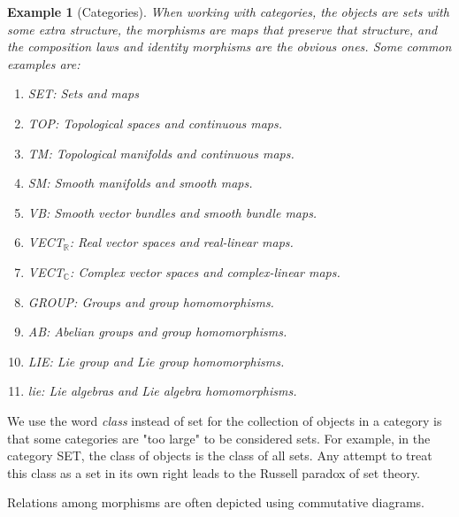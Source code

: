 \documentclass{article}
\newtheorem{example}{Example}[section]
\theoremstyle{remark}
\theoremstyle{definition}
\begin{document}
    \begin{example}[Categories]
    When working with categories, the objects are sets with some extra structure, the morphisms are maps that preserve that structure, and the composition laws and identity morphisms are the obvious ones. Some common examples are: 
    \begin{enumerate}
        \item SET: Sets and maps 
        \item TOP: Topological spaces and continuous maps. 
        \item TM: Topological manifolds and continuous maps. 
        \item SM: Smooth manifolds and smooth maps. 
        \item VB: Smooth vector bundles and smooth bundle maps. 
        \item VECT$_\mathbb{R}$: Real vector spaces and real-linear maps. 
        \item VECT$_\mathbb{C}$: Complex vector spaces and complex-linear maps. 
        \item GROUP: Groups and group homomorphisms. 
        \item AB: Abelian groups and group homomorphisms. \item LIE: Lie group and Lie group homomorphisms. 
        \item lie: Lie algebras and Lie algebra homomorphisms. 
    \end{enumerate}
    \end{example}

    We use the word \textit{class} instead of set for the collection of objects in a category is that some categories are "too large" to be considered sets. For example, in the category SET, the class of objects is the class of all sets. Any attempt to treat this class as a set in its own right leads to the Russell paradox of set theory. 

    Relations among morphisms are often depicted using commutative diagrams. 
\end{document}
